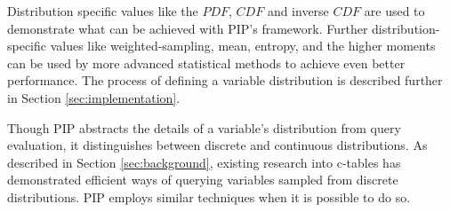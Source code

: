 Distribution specific values like the $PDF$, $CDF$ and inverse $CDF$ are used to demonstrate what can be achieved with PIP's framework.  Further distribution-specific values like weighted-sampling, mean, entropy, and the higher moments can be used by more advanced statistical methods to achieve even better performance.  The process of defining a variable distribution is described further in Section \ref{sec:implementation}.  

Though PIP abstracts the details of a variable's distribution from query evaluation, it distinguishes between discrete and continuous distributions.  As described in Section \ref{sec:background}, existing research into c-tables has demonstrated efficient ways of querying variables sampled from discrete distributions.  PIP employs similar techniques when it is possible to do so.

